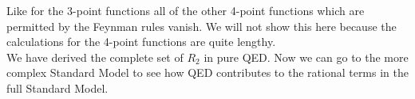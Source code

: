 Like for the 3-point functions all of the other 4-point functions which are permitted by the Feynman rules vanish. We will not show this here because the calculations for the 4-point functions are quite lengthy. \\
We have derived the complete set of $R_2$ in pure QED. Now we can go to the more complex Standard Model to see how QED contributes to the rational terms in the full Standard Model.